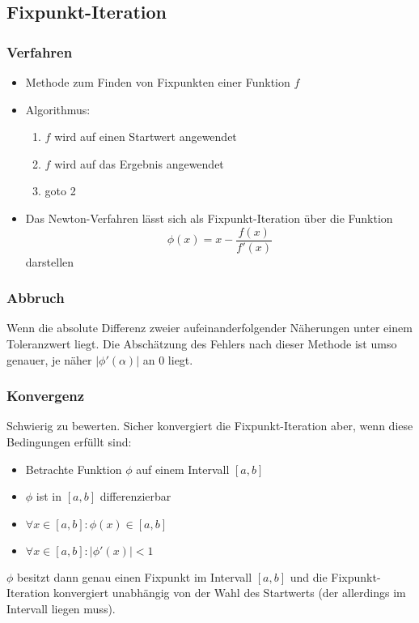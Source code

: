 \documentclass[a4paper, 12pt]{article}
\begin{document}
\subsection{Fixpunkt-Iteration}

\subsubsection*{Verfahren}
\begin{itemize}
  \item Methode zum Finden von Fixpunkten einer Funktion \(f\)
  \item Algorithmus:
    \begin{enumerate}
      \item \(f\) wird auf einen Startwert angewendet
      \item \(f\) wird auf das Ergebnis angewendet
      \item goto 2
    \end{enumerate}
  \item Das Newton-Verfahren lässt sich als Fixpunkt-Iteration über die Funktion
    \[\phi(x) = x-\frac{f(x)}{f'(x)}\]
    darstellen
\end{itemize}

\subsubsection*{Abbruch}
Wenn die absolute Differenz zweier aufeinanderfolgender Näherungen unter einem Toleranzwert liegt. Die Abschätzung des Fehlers nach dieser Methode ist umso genauer, je näher \(|\phi'(\alpha)|\) an 0 liegt.

\subsubsection*{Konvergenz}
Schwierig zu bewerten. Sicher konvergiert die Fixpunkt-Iteration aber, wenn diese Bedingungen erfüllt sind:
\begin{itemize}
  \item Betrachte Funktion \(\phi\) auf einem Intervall \([a,b]\)
  \item \(\phi\) ist in \([a,b]\) differenzierbar
  \item \(\forall x \in [a,b]: \phi(x) \in [a,b]\)
  \item \(\forall x \in [a,b]: |\phi'(x)|<1\)
\end{itemize}
\(\phi\) besitzt dann genau einen Fixpunkt im Intervall \([a,b]\) und die Fixpunkt-Iteration konvergiert unabhängig von der Wahl des Startwerts (der allerdings im Intervall liegen muss).
\end{document}
